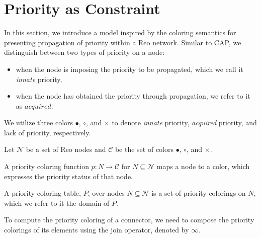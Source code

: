 
\section{Priority as Constraint}
In this section, we introduce a model inspired by the coloring semantics \cite{coloring} for presenting propagation of priority within a Reo network. Similar to CAP, we distinguish between two types of priority on a node:

\begin{itemize}
\item
 when the node is imposing the priority to be propagated, which we call it \emph{innate} priority, 
\item when the node has obtained the priority through propagation, we refer to it as $acquired$. 
\end{itemize}

We utilize three colors $\bullet$, $\circ$, and $\times$ to denote \emph{innate} priority, \emph{acquired} priority, and lack of priority, respectively.

Let $\mathcal{N}$ be a set of Reo nodes and $\mathcal{C}$ be the set of colors $\bullet$, $\circ$, and $\times$.

\begin{definition}
A priority coloring function $p : N \rightarrow \mathcal{C}$ for $N \subseteq \mathcal{N}$ maps
a node to a color, which expresses the priority status of that node.%
\end{definition}

\begin{definition}
 A priority coloring table, $P$, over nodes $N \subseteq \mathcal{N}$ is a set of priority colorings on $N$, which we refer to it the domain of $P$.
\end{definition}%

To compute the priority coloring of a connector, we need to compose the priority colorings of its elements using  the join operator, denoted by $\infty$. %

